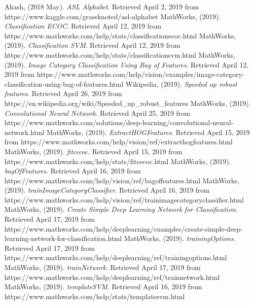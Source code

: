 \documentclass[conference]{IEEEtran}
\begin{document}
%
%
%
\begin{thebibliography}{14}

Akash, (2018 May). \emph{ASL Alphabet}. Retrieved April 2, 2019 from https://www.kaggle.com/grassknoted/asl-alphabet 
MathWorks, (2019). \emph{Classification ECOC}. Retrieved April 12, 2019 from https://www.mathworks.com/help/stats/classificationecoc.html 
MathWorks, (2019). \emph{Classification SVM}. Retrieved April 12, 2019 from https://www.mathworks.com/help/stats/classificationsvm.html 
MathWorks, (2019). \emph{Image Category Classification Using Bag of Features}. Retrieved April 12, 2019 from https://www.mathworks.com/help/vision/examples/image-category-classification-using-bag-of-features.html 
Wikipedia, (2019). \emph{Speeded up robust features}. Retrieved April 26, 2019 from https://en.wikipedia.org/wiki/Speeded\_up\_robust\_features
MathWorks, (2019). \emph{Convolutional Neural Network}. Retrieved April 25, 2019 from https://www.mathworks.com/solutions/deep-learning/convolutional-neural-network.html 
MathWorks, (2019). \emph{ExtractHOGFeatures}. Retrieved April 15, 2019 from https://www.mathworks.com/help/vision/ref/extracthogfeatures.html 
MathWorks, (2019). \emph{fitcecoc}. Retrieved April 15, 2019 from https://www.mathworks.com/help/stats/fitcecoc.html
MathWorks, (2019). \emph{bagOfFeatures}. Retrieved April 16, 2019 from https://www.mathworks.com/help/vision/ref/bagoffeatures.html 
 MathWorks, (2019). \emph{trainImageCategoryClassifier}. Retrieved April 16, 2019 from https://www.mathworks.com/help/vision/ref/trainimagecategoryclassifier.html
MathWorks, (2019). \emph{Create Simple Deep Learning Network for Classification}. Retrieved April 17, 2019 from https://www.mathworks.com/help/deeplearning/examples/create-simple-deep-learning-network-for-classification.html
MathWorks, (2019). \emph{trainingOptions}. Retrieved April 17, 2019 from https://www.mathworks.com/help/deeplearning/ref/trainingoptions.html 
MathWorks, (2019). \emph{trainNetwork}. Retrieved April 17, 2019 from https://www.mathworks.com/help/deeplearning/ref/trainnetwork.html 
MathWorks, (2019). \emph{templateSVM}. Retrieved April 16, 2019 from https://www.mathworks.com/help/stats/templatesvm.html 


\end{thebibliography}




\end{document}
